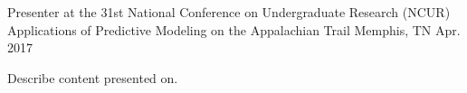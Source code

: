 \begin{cventries}
  \cventry
    {Presenter at the 31st National Conference on Undergraduate Research (NCUR)}
    {Applications of Predictive Modeling on the Appalachian Trail}
    {Memphis, TN}
    {Apr. 2017}
    {
      \begin{cvitems}
        \item {Describe content presented on.}
      \end{cvitems}
    }
\end{cventries}
